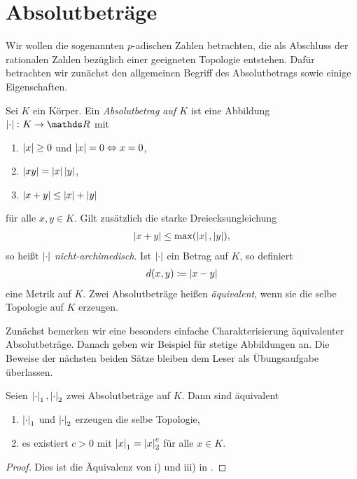 \chapter{Absolutbeträge}

Wir wollen die sogenannten $p$-adischen Zahlen betrachten, die als
Abschluss der rationalen Zahlen bezüglich einer geeigneten Topologie entstehen.
Dafür betrachten wir zunächst den allgemeinen Begriff des Absolutbetrags sowie einige Eigenschaften.

\begin{defi}
Sei $K$ ein Körper. Ein \emph{Absolutbetrag auf $K$} ist eine Abbildung $\abs{\cdot}\colon K \to \R$ mit
\begin{enumerate}[label=\roman*)]
\item $\left\vert x\right\vert\geq 0$ und $\left\vert x\right\vert=0 \Leftrightarrow x=0$,
\item $\left\vert xy\right\vert=\left\vert x\right\vert\left\vert y\right\vert$,
\item $\left\vert x+y\right\vert\leq \left\vert x\right\vert+\left\vert y\right\vert$
\end{enumerate}
für alle $x,y\in K$.
Gilt zusätzlich die starke Dreiecksungleichung
\begin{align*}
\left\vert x+y\right\vert\leq \max(\left\vert x\right\vert,\left\vert y\right\vert),
\end{align*}
so heißt $\left\vert\cdot\right\vert$ \emph{nicht-archimedisch}.
Ist $\left\vert\cdot\right\vert$ ein Betrag auf $K$, so definiert
\begin{align*}
d(x,y)\coloneqq \left\vert x-y\right\vert
\end{align*}
eine Metrik auf $K$.
Zwei Absolutbeträge heißen \emph{äquivalent}, wenn sie die selbe Topologie auf $K$ erzeugen.
\end{defi}

Zunächst bemerken wir eine besonders einfache Charakterisierung äquivalenter Absolutbeträge.
Danach geben wir Beispiel für stetige Abbildungen an.
Die Beweise der nächsten beiden Sätze bleiben dem Leser als Übungsaufgabe überlassen.


\begin{satz}
Seien $\left\vert\cdot\right\vert_1,\left\vert\cdot\right\vert_2$ zwei Absolutbeträge auf $K$.
Dann sind äquivalent
\begin{enumerate}[label=\roman*)]
\item $\left\vert\cdot\right\vert_1$ und $\left\vert\cdot\right\vert_2$ erzeugen die selbe Topologie,
\item es existiert $c>0$ mit $\left\vert x\right\vert_1=\left\vert x\right\vert_2^c$ für alle $x\in K$.
\end{enumerate}
\end{satz}
\begin{proof}
Dies ist die Äquivalenz von i) und iii) in \cite[Lemma 3.1.2]{Gouvea}.
\end{proof}

